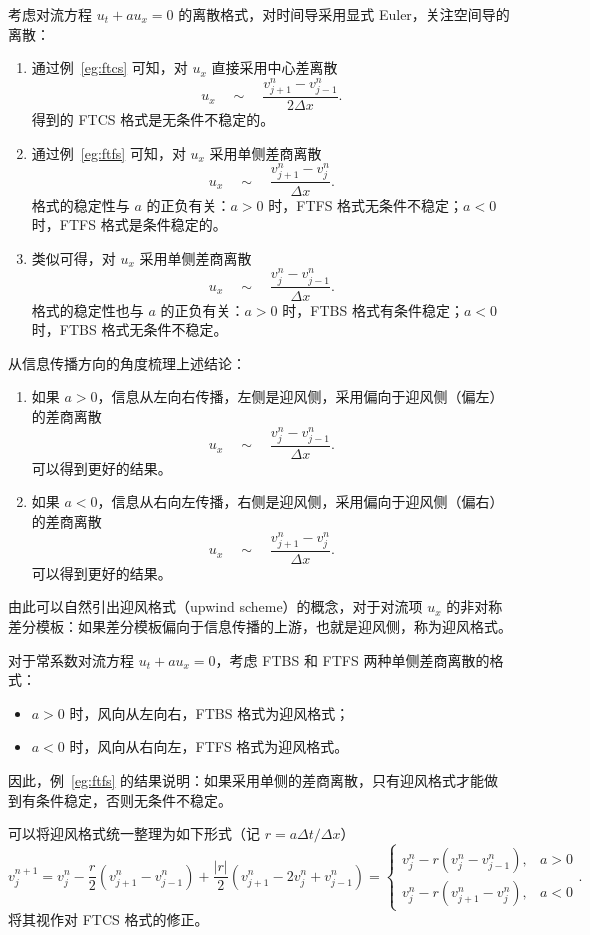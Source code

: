 考虑对流方程 $u_t + a u_x = 0$ 的离散格式，对时间导采用显式 Euler，关注空间导的离散：
\begin{enumerate}
    \item 通过例~\ref{eg:ftcs} 可知，对 $u_x$ 直接采用中心差离散
          \[
              u_x \quad\sim\quad \frac{v_{j+1}^n - v_{j-1}^n}{2 \Delta x}.
          \]
          得到的 FTCS 格式是无条件不稳定的。

    \item 通过例~\ref{eg:ftfs} 可知，对 $u_x$ 采用单侧差商离散
          \[
              u_x \quad\sim\quad \frac{v_{j+1}^n - v_{j}^n}{\Delta x}.
          \]
          格式的稳定性与 $a$ 的正负有关：$a > 0$ 时，FTFS 格式无条件不稳定；$a < 0$ 时，FTFS 格式是条件稳定的。

    \item 类似可得，对 $u_x$ 采用单侧差商离散
          \[
              u_x \quad\sim\quad \frac{v_{j}^n - v_{j-1}^n}{\Delta x}.
          \]
          格式的稳定性也与 $a$ 的正负有关：$a > 0$ 时，FTBS 格式有条件稳定；$a < 0$ 时，FTBS 格式无条件不稳定。
\end{enumerate}
从信息传播方向的角度梳理上述结论：
\begin{enumerate}
    \item 如果 $a > 0$，信息从左向右传播，左侧是迎风侧，采用偏向于迎风侧（偏左）的差商离散
          \[
              u_x \quad\sim\quad \frac{v_{j}^n - v_{j-1}^n}{\Delta x}.
          \]
          可以得到更好的结果。

    \item 如果 $a < 0$，信息从右向左传播，右侧是迎风侧，采用偏向于迎风侧（偏右）的差商离散
          \[
              u_x \quad\sim\quad \frac{v_{j+1}^n - v_{j}^n}{\Delta x}.
          \]
          可以得到更好的结果。
\end{enumerate}
由此可以自然引出迎风格式（upwind scheme）的概念，对于对流项 $u_x$ 的非对称差分模板：如果差分模板偏向于信息传播的上游，也就是迎风侧，称为迎风格式。

对于常系数对流方程 $u_t + a u_x = 0$，考虑 FTBS 和 FTFS 两种单侧差商离散的格式：
\begin{itemize}
    \item $a > 0$ 时，风向从左向右，FTBS 格式为迎风格式；
    \item $a < 0$ 时，风向从右向左，FTFS 格式为迎风格式。
\end{itemize}
因此，例~\ref{eg:ftfs} 的结果说明：如果采用单侧的差商离散，只有迎风格式才能做到有条件稳定，否则无条件不稳定。

可以将迎风格式统一整理为如下形式（记 $r = a \Delta t / \Delta x$）
\[
    v_j^{n+1} = v_j^n - \frac{r}2 (v_{j+1}^n - v_{j-1}^{n}) + \frac{|r|}2 (v_{j+1}^n - 2 v_j^n + v_{j-1}^{n})
    =
    \begin{cases}
        v_j^n - r (v_{j}^n - v_{j-1}^{n}), & a > 0 \\
        v_j^n - r (v_{j+1}^n - v_{j}^{n}), & a < 0
    \end{cases}.
\]
将其视作对 FTCS 格式的修正。

